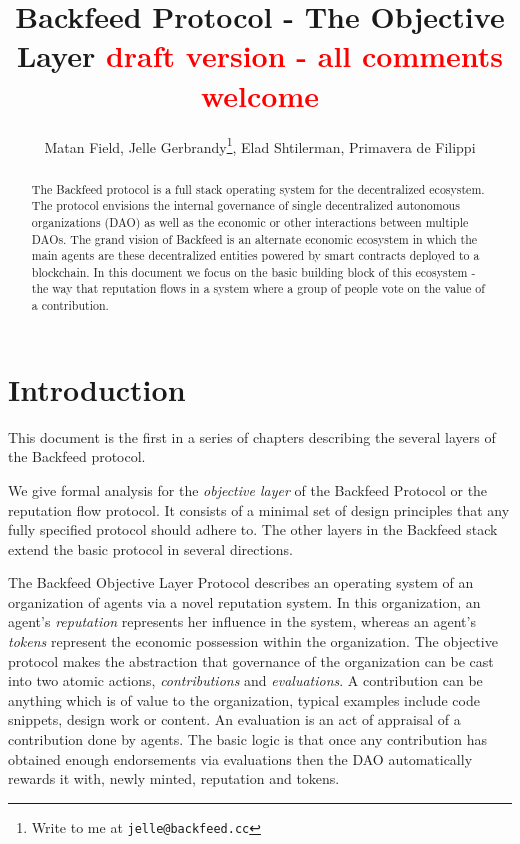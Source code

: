 \documentclass{article}
\newcommand{\rednote}[1]{\textcolor{red}{#1}}
\begin{document}
\title{Backfeed Protocol - The Objective Layer
\newline
\rednote{draft version - all comments welcome}
}
\author{Matan Field, Jelle Gerbrandy\footnote{Write to me at {\tt jelle@backfeed.cc}}, Elad Shtilerman, Primavera de Filippi}
\date{}
\maketitle

\begin{abstract}
The Backfeed protocol is a full stack operating system for the decentralized ecosystem. The protocol envisions the internal governance of single decentralized autonomous organizations (DAO) as well as the economic or other interactions between multiple DAOs. The grand vision of Backfeed is an alternate economic ecosystem in which the main agents are these decentralized entities powered by smart contracts deployed to a blockchain. In this document we focus on the basic building block of this ecosystem - the way that reputation flows in a system where a group of people vote on the value of a contribution.
\end{abstract}

\section{Introduction}

This document is the first in a series of chapters describing the several layers of the Backfeed protocol. 

We give formal analysis for the {\em objective layer} of the Backfeed Protocol or the reputation flow protocol.
It consists of a minimal set of design principles that any fully specified protocol should adhere to.
The other layers in the Backfeed stack extend the basic protocol in several directions.

The Backfeed Objective Layer Protocol describes an operating system of an organization of agents via a novel reputation system. In this organization, an agent's {\em reputation} represents her influence in the system, whereas an agent's {\em tokens} represent the economic possession within the organization. The objective protocol makes the abstraction that governance of the organization can be cast into two atomic actions, {\em contributions} and {\em evaluations}. A contribution can be anything which is of value to the organization, typical examples include code snippets, design work or content. An evaluation is an act of appraisal of a contribution done by agents. The basic logic is that once any contribution has obtained enough endorsements via evaluations then the DAO automatically rewards it with, newly minted, reputation and tokens.
\end{document}
